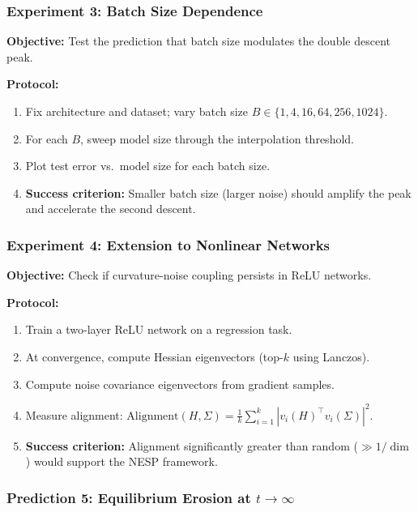 \documentclass[
  journal=largetwo,
  simfonts=false,
  year=2025,
  volume=37,
]{cup-journal}
\begin{document}
\subsubsection{Experiment 3: Batch Size Dependence}

\textbf{Objective:} Test the prediction that batch size modulates the double descent peak.

\textbf{Protocol:}
\begin{enumerate}
    \item Fix architecture and dataset; vary batch size $B \in \{1, 4, 16, 64, 256, 1024\}$.
    \item For each $B$, sweep model size through the interpolation threshold.
    \item Plot test error vs.\ model size for each batch size.
    \item \textbf{Success criterion:} Smaller batch size (larger noise) should amplify the peak and accelerate the second descent.
\end{enumerate}

\subsubsection{Experiment 4: Extension to Nonlinear Networks}

\textbf{Objective:} Check if curvature-noise coupling persists in ReLU networks.

\textbf{Protocol:}
\begin{enumerate}
    \item Train a two-layer ReLU network on a regression task.
    \item At convergence, compute Hessian eigenvectors (top-$k$ using Lanczos).
    \item Compute noise covariance eigenvectors from gradient samples.
    \item Measure alignment: $\text{Alignment}(H, \Sigma) = \frac{1}{k} \sum_{i=1}^{k} |v_i(H)^\top v_i(\Sigma)|^2$.
    \item \textbf{Success criterion:} Alignment significantly greater than random ($\gg 1/\dim$) would support the NESP framework.
\end{enumerate}

\subsubsection{Prediction 5: Equilibrium Erosion at $t \to \infty$}
\label{sec:equilibrium_erosion}
\end{document}
